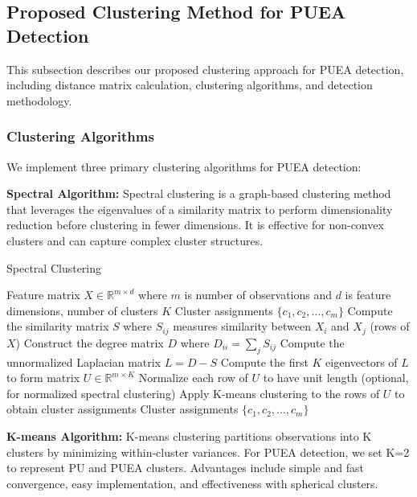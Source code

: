 \documentclass[pdflatex,sn-mathphys-num]{sn-jnl}%
\theoremstyle{thmstyleone}
\theoremstyle{thmstyletwo}
\theoremstyle{thmstylethree}
\begin{document}
\subsection{Proposed Clustering Method for PUEA Detection}\label{subsec:basic_clustering}

This subsection describes our proposed clustering approach for PUEA detection, including distance matrix calculation, clustering algorithms, and detection methodology.

\subsubsection{Clustering Algorithms}

We implement three primary clustering algorithms for PUEA detection:

\textbf{Spectral Algorithm:} Spectral clustering is a graph-based clustering method that leverages the eigenvalues of a similarity matrix to perform dimensionality reduction before clustering in fewer dimensions. It is effective for non-convex clusters and can capture complex cluster structures.

\begin{algorithm}[H]
\caption{Spectral Clustering}
\label{alg:spectral_clustering}
\begin{algorithmic}[1]
\Require Feature matrix $X \in \mathbb{R}^{m \times d}$ where $m$ is number of observations and $d$ is feature dimensions, number of clusters $K$
\Ensure Cluster assignments $\{c_1, c_2, \ldots, c_m\}$
\State Compute the similarity matrix $S$ where $S_{ij}$ measures similarity between $X_i$ and $X_j$ (rows of $X$)
\State Construct the degree matrix $D$ where $D_{ii} = \sum_{j} S_{ij}$
\State Compute the unnormalized Laplacian matrix $L = D - S$
\State Compute the first $K$ eigenvectors of $L$ to form matrix $U \in \mathbb{R}^{m \times K}$
\State Normalize each row of $U$ to have unit length (optional, for normalized spectral clustering)
\State Apply K-means clustering to the rows of $U$ to obtain cluster assignments
\State \Return Cluster assignments $\{c_1, c_2, \ldots, c_m\}$
\end{algorithmic}
\end{algorithm}

\textbf{K-means Algorithm:} K-means clustering partitions observations into K clusters by minimizing within-cluster variances. For PUEA detection, we set K=2 to represent PU and PUEA clusters. Advantages include simple and fast convergence, easy implementation, and effectiveness with spherical clusters.
\end{document}
